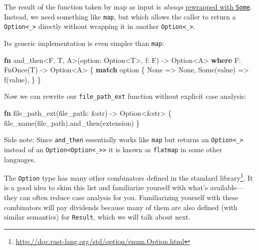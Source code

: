 \documentclass[a4paper,]{book}
\newenvironment{Shaded}{\begin{snugshade}}{\end{snugshade}}
\newcommand{\KeywordTok}[1]{\textcolor[rgb]{0.13,0.29,0.53}{\textbf{{#1}}}}
\newcommand{\DataTypeTok}[1]{\textcolor[rgb]{0.13,0.29,0.53}{{#1}}}
\newcommand{\ConstantTok}[1]{\textcolor[rgb]{0.00,0.00,0.00}{{#1}}}
\newcommand{\BuiltInTok}[1]{{#1}}
\newcommand{\NormalTok}[1]{{#1}}
\renewcommand{\href}[2]{#2\footnote{\url{#1}}}
\begin{document}
The result of the function taken by map as input is \emph{always}
\protect\hyperlink{code-option-map}{rewrapped with \texttt{Some}}.
Instead, we need something like \texttt{map}, but which allows the
caller to return a \texttt{Option\textless{}\_\textgreater{}} directly
without wrapping it in another
\texttt{Option\textless{}\_\textgreater{}}.

Its generic implementation is even simpler than \texttt{map}:

\begin{Shaded}
\begin{Highlighting}[]
\KeywordTok{fn} \NormalTok{and_then<F, T, A>(option: }\DataTypeTok{Option}\NormalTok{<T>, f: F) -> }\DataTypeTok{Option}\NormalTok{<A>}
        \KeywordTok{where} \NormalTok{F: }\BuiltInTok{FnOnce}\NormalTok{(T) -> }\DataTypeTok{Option}\NormalTok{<A> \{}
    \KeywordTok{match} \NormalTok{option \{}
        \ConstantTok{None} \NormalTok{=> }\ConstantTok{None}\NormalTok{,}
        \ConstantTok{Some}\NormalTok{(value) => f(value),}
    \NormalTok{\}}
\NormalTok{\}}
\end{Highlighting}
\end{Shaded}

Now we can rewrite our \texttt{file\_path\_ext} function without
explicit case analysis:

\begin{Shaded}
\begin{Highlighting}[]
\KeywordTok{fn} \NormalTok{file_path_ext(file_path: &}\DataTypeTok{str}\NormalTok{) -> }\DataTypeTok{Option}\NormalTok{<&}\DataTypeTok{str}\NormalTok{> \{}
    \NormalTok{file_name(file_path).and_then(extension)}
\NormalTok{\}}
\end{Highlighting}
\end{Shaded}

Side note: Since \texttt{and\_then} essentially works like \texttt{map}
but returns an \texttt{Option\textless{}\_\textgreater{}} instead of an
\texttt{Option\textless{}Option\textless{}\_\textgreater{}\textgreater{}}
it is known as \texttt{flatmap} in some other languages.

The \texttt{Option} type has many other combinators
\href{http://doc.rust-lang.org/std/option/enum.Option.html}{defined in
the standard library}. It is a good idea to skim this list and
familiarize yourself with what's available---they can often reduce case
analysis for you. Familiarizing yourself with these combinators will pay
dividends because many of them are also defined (with similar semantics)
for \texttt{Result}, which we will talk about next.
\end{document}
